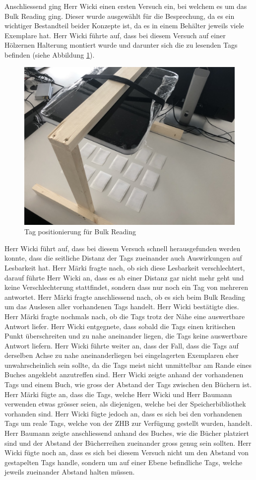 \documentclass[parskip=full, a4paper]{scrreprt}
\begin{document}
Anschliessend ging Herr Wicki einen ersten Versuch ein, bei welchem es um das Bulk Reading ging. Dieser wurde ausgewählt für die Besprechung, da es ein wichtiger Bestandteil beider Konzepte ist, da es in einem Behälter jeweils viele Exemplare hat. Herr Wicki führte auf, dass bei diesem Versuch auf einer Hölzernen Halterung montiert wurde und darunter sich die zu lesenden Tags befinden (siehe Abbildung \ref{fig:positionTagsForBulkreading}).
\begin{figure}[htb]
	\centering
	\includegraphics[keepaspectratio,width=.7\linewidth]{img/PositionTagsBulkreading}
	\caption{Tag positionierung für Bulk Reading}
	\label{fig:positionTagsForBulkreading}
\end{figure}
Herr Wicki führt auf, dass bei diesem Versuch schnell herausgefunden werden konnte, dass die seitliche Distanz der Tags zueinander auch Auswirkungen auf Lesbarkeit hat. Herr Märki fragte nach, ob sich diese Lesbarkeit verschlechtert, darauf führte Herr Wicki an, dass es ab einer Distanz gar nicht mehr geht und keine Verschlechterung stattfindet, sondern dass nur noch ein Tag von mehreren antwortet. Herr Märki fragte anschliessend nach, ob es sich beim Bulk Reading um das Auslesen aller vorhandenen Tags handelt. Herr Wicki bestätigte dies. Herr Märki fragte nochmals nach, ob die Tags trotz der Nähe eine auswertbare Antwort liefer. Herr Wicki entgegnete, dass sobald die Tags einen kritischen Punkt überschreiten und zu nahe aneinander liegen, die Tags keine auswertbare Antwort liefern. Herr Wicki führte weiter an, dass der Fall, dass die Tags auf derselben Achse zu nahe aneinanderliegen bei eingelagerten Exemplaren eher unwahrscheinlich sein sollte, da die Tags meist nicht unmittelbar am Rande eines Buches angeklebt anzutreffen sind. Herr Wicki zeigte anhand der vorhandenen Tags und einem Buch, wie gross der Abstand der Tags zwischen den Büchern ist. Herr Märki fügte an, dass die Tags, welche Herr Wicki und Herr Baumann verwenden etwas grösser seien, als diejenigen, welche bei der Speicherbibliothek vorhanden sind. Herr Wicki fügte jedoch an, dass es sich bei den vorhandenen Tags um reale Tags, welche von der ZHB zur Verfügung gestellt wurden, handelt. Herr Baumann zeigte anschliessend anhand des Buches, wie die Bücher platziert sind und der Abstand der Bücherreihen zueinander gross genug sein sollten. Herr Wicki fügte noch an, dass es sich bei diesem Versuch nicht um den Abstand von gestapelten Tags handle, sondern um auf einer Ebene befindliche Tags, welche jeweils zueinander Abstand halten müssen.
\end{document}
